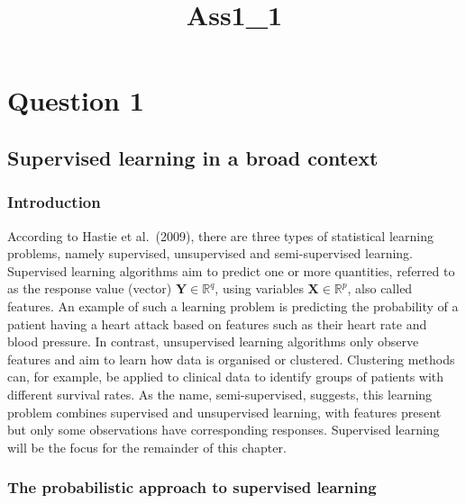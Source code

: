 \documentclass[11pt]{article}
\title{Ass1\_1}
\begin{document}
    
    \maketitle
    
    

    
    \section{Question 1}\label{question-1}

\subsection{Supervised learning in a broad
context}\label{supervised-learning-in-a-broad-context}

\subsubsection{Introduction}\label{introduction}

According to Hastie et al.~(2009), there are three types of statistical
learning problems, namely supervised, unsupervised and semi-supervised
learning. Supervised learning algorithms aim to predict one or more
quantities, referred to as the response value (vector)
\(\mathbf{Y}\in\mathbb{R}^q\), using variables
\(\mathbf{X}\in\mathbb{R}^p\), also called features. An example of such
a learning problem is predicting the probability of a patient having a
heart attack based on features such as their heart rate and blood
pressure. In contrast, unsupervised learning algorithms only observe
features and aim to learn how data is organised or clustered. Clustering
methods can, for example, be applied to clinical data to identify groups
of patients with different survival rates. As the name, semi-supervised,
suggests, this learning problem combines supervised and unsupervised
learning, with features present but only some observations have
corresponding responses. Supervised learning will be the focus for the
remainder of this chapter.

    \subsubsection{The probabilistic approach to supervised
learning}\label{the-probabilistic-approach-to-supervised-learning}
\end{document}
